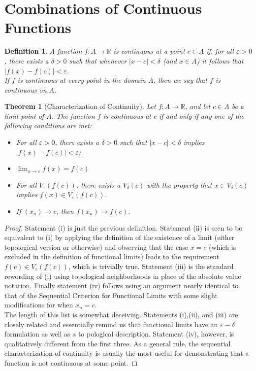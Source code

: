 \documentclass[10pt]{report}
\newtheorem{thm2}{Theorem}[section]
\newtheorem{def2}{Definition}[section]
\newcommand{\eps}{\varepsilon}
\begin{document}
\section{Combinations of Continuous Functions}
\begin{def2}
A function $f:A\to\mathbb{R}$ is continuous at a point $c\in A$ if, for all $\eps>0$, there exists a $\delta>0$ such that whenever $|x-c|<\delta$ (and $x\in A$) it follows that $|f(x) - f(c)|<\eps$.\\
If $f$ is continuous at every point in the domain $A$, then we say that $f$ is continuous on $A$.
\end{def2}
\begin{thm2}[Characterization of Continuity]
Let $f:A\to \mathbb{R}$, and let $c\in A$ be a limit point of $A$. The function $f$ is continuous at $c$ if and only if any one of the following conditions are met:
\begin{itemize}
\item[(i)] For all $\eps>0$, there exists a $\delta>0$ such that $|x-c|<\delta$ implies $|f(x)-f(c)|<\eps$;
\item[(ii)] $\lim_{x\to c} f(x) = f(c)$
\item[(iii)] For all $V_\eps (f(c))$, there exists a $V_\delta(c)$ with the property that $x\in V_\delta(c)$ implies $f(x)\in V_\eps(f(c))$.
\item[(iv)] If $(x_n)\to c$, then $f(x_n)\to f(c)$.
\end{itemize}
\end{thm2}
\begin{proof}
Statement (i) is just the previous definition. Statement (ii) is seen to be equivalent to (i) by applying the definition of the existence of a limit (either topological version or otherwise) and observing that the case $x=c$ (which is excluded in the definition of functional limits) leads to the requirement $f(c)\in V_\eps (f(c))$, which is trivially true. Statement (iii) is the standard rewording of (i) using topological neighborhoods in place of the absolute value notation. Finally statement (iv) follows using an argument nearly identical to that of the Sequential Criterion for Functional Limits with some slight modifications for when $x_n=c$.\\
The length of this list is somewhat deceiving. Statements (i),(ii), and (iii) are closely related and essentially remind us that functional limits have an $\eps - \delta$ formulation as well as a to pological description. Statement (iv), however, is qualitatively different from the first three. As a general rule, the sequential characterization of continuity is usually the most useful for demonstrating that a function is not continuous at some point.
\end{proof}
\end{document}
